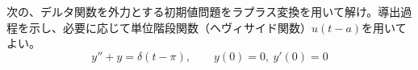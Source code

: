 
次の、デルタ関数を外力とする初期値問題をラプラス変換を用いて解け。導出過程を示し、必要に応じて単位階段関数（ヘヴィサイド関数）$u(t-a)$を用いてよい。
\[
y'' + y = \delta(t - \pi), \qquad y(0) = 0,\ y'(0) = 0
\]
